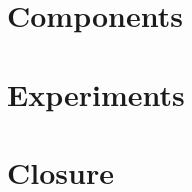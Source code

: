 \chapter{Components} \label{c:Components}				%

\chapter{Experiments}		%



\chapter{Closure} \label{c:Closure}			


\appendix
\printindex					%
\listoffigures				%
\printbibliography[			%
	heading=bibintoc,
	title={Bibliography}]
	

